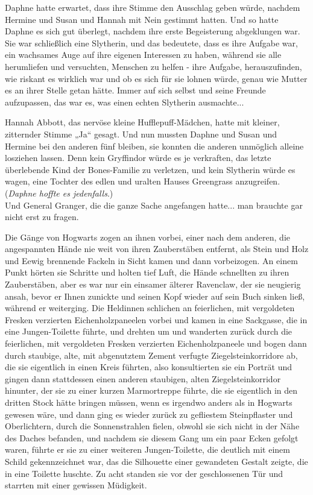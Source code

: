 {Daphne hatte erwartet, dass ihre Stimme den Ausschlag geben würde, nachdem Hermine und Susan und Hannah mit Nein gestimmt hatten. Und so hatte Daphne es sich gut überlegt, nachdem ihre erste Begeisterung abgeklungen war. Sie war schließlich eine Slytherin, und das bedeutete, dass es ihre Aufgabe war, ein wachsames Auge auf ihre eigenen Interessen zu haben, während sie alle herumliefen und versuchten, Menschen zu helfen - ihre Aufgabe, herauszufinden, wie riskant es wirklich war und ob es sich für sie lohnen würde, genau wie Mutter es an ihrer Stelle getan hätte. Immer auf sich selbst und seine Freunde aufzupassen, das war es, was einen echten Slytherin ausmachte...

Hannah Abbott, das nervöse kleine Hufflepuff-Mädchen, hatte mit kleiner, zitternder Stimme „Ja“ gesagt. Und nun mussten Daphne und Susan und Hermine bei den anderen fünf bleiben, sie konnten die anderen unmöglich alleine losziehen lassen. Denn kein Gryffindor würde es je verkraften, das letzte überlebende Kind der Bones-Familie zu verletzen, und kein Slytherin würde es wagen, eine Tochter des edlen und uralten Hauses Greengrass anzugreifen. (\emph{Daphne hoffte es jedenfalls}.)\\ Und General Granger, die die ganze Sache angefangen hatte... man brauchte gar nicht erst zu fragen.

Die Gänge von Hogwarts zogen an ihnen vorbei, einer nach dem anderen, die angespannten Hände nie weit von ihren Zauberstäben entfernt, als Stein und Holz und Eewig brennende Fackeln in Sicht kamen und dann vorbeizogen. An einem Punkt hörten sie Schritte und holten tief Luft, die Hände schnellten zu ihren Zauberstäben, aber es war nur ein einsamer älterer Ravenclaw, der sie neugierig ansah, bevor er Ihnen zunickte und seinen Kopf wieder auf sein Buch sinken ließ, während er weiterging. Die Heldinnen schlichen an feierlichen, mit vergoldeten Fresken verzierten Eichenholzpaneelen vorbei und kamen in eine Sackgasse, die in eine Jungen-Toilette führte, und drehten um und wanderten zurück durch die feierlichen, mit vergoldeten Fresken verzierten Eichenholzpaneele und bogen dann durch staubige, alte, mit abgenutztem Zement verfugte Ziegelsteinkorridore ab, die sie eigentlich in einen Kreis führten, also konsultierten sie ein Porträt und gingen dann stattdessen einen anderen staubigen, alten Ziegelsteinkorridor hinunter, der sie zu einer kurzen Marmortreppe führte, die sie eigentlich in den dritten Stock hätte bringen müssen, wenn es irgendwo anders als in Hogwarts gewesen wäre, und dann ging es wieder zurück zu gefliestem Steinpflaster und Oberlichtern, durch die Sonnenstrahlen fielen, obwohl sie sich nicht in der Nähe des Daches befanden, und nachdem sie diesem Gang um ein paar Ecken gefolgt waren, führte er sie zu einer weiteren Jungen-Toilette, die deutlich mit einem Schild gekennzeichnet war, das die Silhouette einer gewandeten Gestalt zeigte, die in eine Toilette huschte. Zu acht standen sie vor der geschlossenen Tür und starrten mit einer gewissen Müdigkeit.

}
